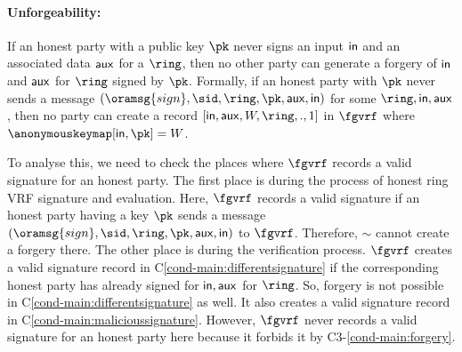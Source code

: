 	\paragraph{Unforgeability:}  If an honest party with a public key $ \pk $ never signs an input $ \mathsf{in} $  and an associated data $ \mathsf{aux} $ for a $ \ring $, then no other party can generate a  forgery of $ \mathsf{in} $ and $ \mathsf{aux} $ for $ \ring $ signed by $ \pk $. Formally, if an honest party with $ \pk $ never sends a message $(\oramsg{sign}, \sid, \ring, \pk,\aux, \msg)$ for some $ \ring, \msg, \aux $, then  no party can create a record $ [\msg, \aux,W,\ring, ., 1] $ in $ \fgvrf $  where $ \anonymouskeymap[\msg,\pk] = W $.
	
	To analyse this, we need to check the places where $ \fgvrf $ records a valid signature for an honest party. The first place is during the process of honest ring VRF signature and evaluation. Here, $ \fgvrf $ records a valid signature if an honest party having a key $ \pk $ sends a message $ (\oramsg{sign}, \sid,\ring,\pk,\aux,\msg) $ to $ \fgvrf $. Therefore, 	$ \sim $ cannot create a forgery there.
	The other place is during the verification process. $ \fgvrf $ creates a valid signature record in C\ref{cond-main:differentsignature} if the corresponding honest party has already signed for $ \mathsf{in}, \mathsf{aux} $ for $ \ring $. So, forgery is not possible  in C\ref{cond-main:differentsignature} as well. It also creates a valid signature record in C\ref{cond-main:malicioussignature}. However, $ \fgvrf $ never records a valid signature  for an honest party here because it forbids it by C3-\ref{cond-main:forgery}.
	
	
	
